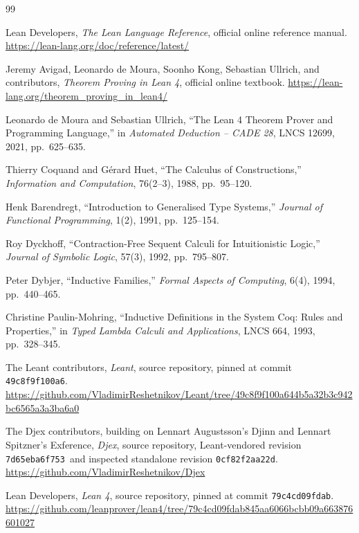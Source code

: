 \documentclass[10pt,letterpaper,oneside,openany]{report}
\newcommand{\LeantCommit}{\texttt{49c8f9f100a6}}
\newcommand{\DjexCommit}{\texttt{0cf82f2aa22d}}
\newcommand{\DjexPinnedCommit}{\texttt{7d65eba6f753}}
\newcommand{\LeanCommit}{\texttt{79c4cd09fdab}}
\begin{document}
\begin{thebibliography}{99}

Lean Developers,
\emph{The Lean Language Reference},
official online reference manual.
\url{https://lean-lang.org/doc/reference/latest/}

Jeremy Avigad, Leonardo de Moura, Soonho Kong, Sebastian Ullrich, and contributors,
\emph{Theorem Proving in Lean 4},
official online textbook.
\url{https://lean-lang.org/theorem_proving_in_lean4/}

Leonardo de Moura and Sebastian Ullrich,
``The Lean 4 Theorem Prover and Programming Language,''
in \emph{Automated Deduction -- CADE 28}, LNCS 12699, 2021, pp.~625--635.

Thierry Coquand and G\'erard Huet,
``The Calculus of Constructions,''
\emph{Information and Computation}, 76(2--3), 1988, pp.~95--120.

Henk Barendregt,
``Introduction to Generalised Type Systems,''
\emph{Journal of Functional Programming}, 1(2), 1991, pp.~125--154.

Roy Dyckhoff,
``Contraction-Free Sequent Calculi for Intuitionistic Logic,''
\emph{Journal of Symbolic Logic}, 57(3), 1992, pp.~795--807.

Peter Dybjer,
``Inductive Families,''
\emph{Formal Aspects of Computing}, 6(4), 1994, pp.~440--465.

Christine Paulin-Mohring,
``Inductive Definitions in the System Coq: Rules and Properties,''
in \emph{Typed Lambda Calculi and Applications}, LNCS 664, 1993, pp.~328--345.

The Leant contributors,
\emph{Leant}, source repository, pinned at commit \LeantCommit.
\url{https://github.com/VladimirReshetnikov/Leant/tree/49c8f9f100a644b5a32b3c942bc6565a3a3ba6a0}

The Djex contributors, building on Lennart Augustsson's Djinn and Lennart Spitzner's Exference,
\emph{Djex}, source repository, Leant-vendored revision \DjexPinnedCommit\ and inspected standalone revision \DjexCommit.
\url{https://github.com/VladimirReshetnikov/Djex}

Lean Developers,
\emph{Lean 4}, source repository, pinned at commit \LeanCommit.
\url{https://github.com/leanprover/lean4/tree/79c4cd09fdab845aa6066bcbb09a663876601027}

\end{thebibliography}
\end{document}
